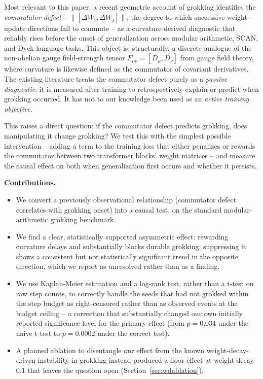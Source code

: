 \documentclass[11pt]{article}
\begin{document}
Most relevant to this paper, a recent geometric account of grokking
\citep{xu2026a,xu2026b} identifies the \emph{commutator defect} --
$\lVert[\Delta W_i, \Delta W_j]\rVert$, the degree to which successive
weight-update directions fail to commute -- as a curvature-derived
diagnostic that reliably rises before the onset of generalization across
modular arithmetic, SCAN, and Dyck-language tasks. This object is,
structurally, a discrete analogue of the non-abelian gauge field-strength
tensor $F_{\mu\nu} = [D_\mu, D_\nu]$ from gauge field theory, where
curvature is likewise defined as the commutator of covariant derivatives.
The existing literature treats the commutator defect purely as a
\emph{passive diagnostic}: it is measured after training to retrospectively
explain or predict when grokking occurred. It has not to our knowledge
been used as an \emph{active training objective}.

This raises a direct question: if the commutator defect predicts grokking,
does manipulating it change grokking? We test this with the simplest
possible intervention -- adding a term to the training loss that either
penalizes or rewards the commutator between two transformer blocks'
weight matrices -- and measure the causal effect on both when generalization
first occurs and whether it persists.

\textbf{Contributions.}
\begin{itemize}
\item We convert a previously observational relationship (commutator
defect correlates with grokking onset) into a causal test, on the standard
modular-arithmetic grokking benchmark.
\item We find a clear, statistically supported asymmetric effect:
rewarding curvature delays and substantially blocks durable grokking;
suppressing it shows a consistent but not statistically significant
trend in the opposite direction, which we report as unresolved rather
than as a finding.
\item We use Kaplan-Meier estimation and a log-rank test, rather than a
t-test on raw step counts, to correctly handle the seeds that had not
grokked within the step budget as right-censored rather than as observed
events at the budget ceiling -- a correction that substantially changed
our own initially reported significance level for the primary effect
(from $p=0.034$ under the naive t-test to $p=0.0002$ under the correct
test).
\item A planned ablation to disentangle our effect from the known
weight-decay-driven instability in grokking \citep{thilak2022slingshot}
instead produced a floor effect at weight decay $0.1$ that leaves the
question open (Section~\ref{sec:wdablation}).
\end{itemize}
\end{document}
